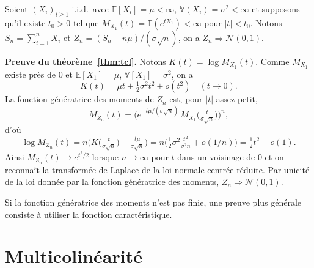 \documentclass[10pt]{beamer}
\begin{document}
\begin{notes}

  \bigskip

\begin{theorem}\label{thm:tcl}
Soient $(X_i)_{i\ge1}$ i.i.d.\ avec $\mathbb E[X_i]=\mu<\infty$, $\mathbb V(X_i)=\sigma^2<\infty$
et supposons qu'il existe $t_0>0$ tel que $M_{X_1}(t)=\mathbb E(e^{tX_1})<\infty$ pour $|t|<t_0$.
Notons $S_n=\sum_{i=1}^n X_i$ et $Z_n=(S_n-n\mu)/(\sigma\sqrt n)$, on a $Z_n\Rightarrow\mathcal N(0,1)$.
\end{theorem}

\bigskip

\textbf{Preuve du théorème~\ref{thm:tcl}.} Notons $K(t)=\log M_{X_1}(t)$. Comme $M_{X_1}$ existe près de $0$
et $\mathbb E [X_1]=\mu$, $\mathbb V [X_1]=\sigma^2$, on a
\[
K(t)=\mu t+\tfrac12\sigma^2t^2+o(t^2)\quad(t\to0).
\]
La fonction génératrice des moments  de $Z_n$ est, pour $|t|$ assez petit,
\[
M_{Z_n}(t)=\Big(e^{-t\mu/(\sigma\sqrt n)}\,M_{X_1}\!\big(\tfrac{t}{\sigma\sqrt n}\big)\Big)^n,
\]
d'où
\[
\log M_{Z_n}(t)=n\Big(K\!\big(\tfrac{t}{\sigma\sqrt n}\big)-\tfrac{t\mu}{\sigma\sqrt n}\Big)
= n\Big(\tfrac12\sigma^2 \tfrac{t^2}{\sigma^2 n}+o(1/n)\Big)=\tfrac12 t^2+o(1).
\]
Ainsi $M_{Z_n}(t)\to e^{t^2/2}$ lorsque $n\to\infty$ pour $t$ dans un
voisinage de $0$ et on reconnaît la transformée de Laplace de la loi
normale centrée réduite.  Par unicité de la loi donnée par la
fonction génératrice des moments, $Z_n\Rightarrow\mathcal N(0,1)$.\newline

Si la fonction génératrice des moments n'est pas finie, une preuve
plus générale consiste à utiliser la fonction caractéristique.

\end{notes}


\section{Multicolinéarité}
\end{document}
